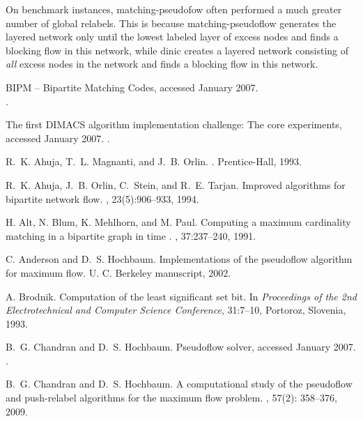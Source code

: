 \documentclass{article}
\begin{document}
\begin{itemize}
On benchmark instances, {\sf matching-pseudofow} often performed a much greater number of global relabels.  This is because {\sf matching-pseudoflow} generates the layered network only until the lowest labeled layer of excess nodes and finds a blocking flow in this network, while {\sf dinic} creates a layered network consisting of {\em all} excess nodes in the network and finds a blocking flow in this network.
\end{itemize}

\begin{thebibliography}{99}

BIPM -- Bipartite Matching Codes, accessed January 2007. \\
.

The first {DIMACS} algorithm implementation challenge: {T}he core experiments, accessed January 2007.
.

R.~K. Ahuja, T.~L. Magnanti, and J.~B. Orlin.
.
\newblock Prentice-Hall, 1993.

R.~K. Ahuja, J.~B. Orlin, C.~Stein, and R.~E. Tarjan.
\newblock Improved algorithms for bipartite network flow.
, 23(5):906--933, 1994.

H. Alt, N. Blum, K. Mehlhorn, and M. Paul.
\newblock Computing a maximum cardinality matching in a bipartite graph in time \mbox{.}
, 37:237--240, 1991.

C. Anderson and D.~S. Hochbaum.
\newblock Implementations of the pseudoflow algorithm for maximum flow.
\newblock U. C. Berkeley manuscript, 2002.

A. Brodnik.
\newblock Computation of the least significant set bit.
\newblock In {\em Proceedings of the 2nd Electrotechnical and Computer Science Conference}, 31:7--10, Portoroz, Slovenia, 1993.
 
B.~G. Chandran and D.~S. Hochbaum.
\newblock Pseudoflow solver, accessed January 2007.
.
 
B.~G. Chandran and D.~S. Hochbaum.
\newblock A computational study of the pseudoflow and push-relabel algorithms for the maximum flow problem.
, 57(2): 358--376, 2009.


\end{thebibliography}
\end{document}
